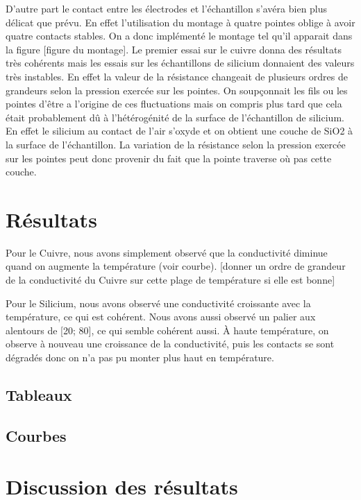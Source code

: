 D'autre part le contact entre les électrodes et l'échantillon s'avéra bien plus délicat que prévu. 
En effet l'utilisation du montage à quatre pointes oblige à avoir quatre contacts stables. On a donc implémenté 
le montage tel qu'il apparait dans la figure [figure du montage]. Le premier essai sur le cuivre donna des résultats 
très cohérents mais les essais sur les échantillons de silicium donnaient des valeurs très instables. 
En effet la valeur de la résistance changeait de plusieurs ordres de grandeurs selon la pression exercée sur les 
pointes. On soupçonnait les fils ou les pointes d'être a l'origine de ces fluctuations 
mais on compris plus tard que cela était probablement dû à l'hétérogénité de la surface de l'échantillon de silicium. 
En effet le silicium au contact de l'air s'oxyde et on obtient une couche de SiO2 à la surface de l'échantillon. 
La variation de la résistance selon la pression exercée sur les pointes peut donc provenir du fait que la pointe 
traverse où pas cette couche.

\section*{Résultats}
Pour le Cuivre, nous avons simplement observé que la conductivité diminue quand on augmente la température (voir courbe).
[donner un ordre de grandeur de la conductivité du Cuivre sur cette plage de température si elle est bonne]


Pour le Silicium, nous avons observé une conductivité croissante avec la température, ce qui est cohérent. Nous avons aussi observé un palier aux alentours de [20\celsius; 80\celsius], ce qui semble cohérent aussi.
À haute température, on observe à nouveau une croissance de la conductivité, 
puis les contacts se sont dégradés donc on n'a pas pu monter plus haut en température.


\subsection*{Tableaux}

\subsection*{Courbes}


\section*{Discussion des résultats}

